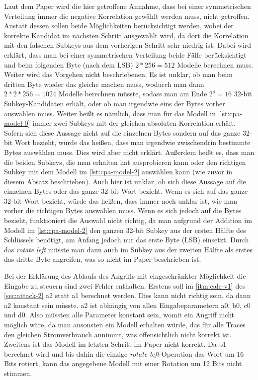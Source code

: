 \documentclass[a4paper,ngerman]{scrreprt}
\begin{document}
Laut dem Paper wird die hier getroffene Annahme, dass bei einer symmetrischen
Verteilung immer die negative Korrelation gewählt werden muss, nicht getroffen.
Anstatt dessen sollen beide Möglichkeiten berücksichtigt werden, wobei der
korrekte Kandidat im nächsten Schritt ausgewählt wird, da dort die Korrelation
mit den falschen Subkeys aus dem vorherigen Schritt sehr niedrig ist. Dabei wird
erklärt, dass man bei einer symmetrischen Verteilung beide Fälle berücksichtigt
und beim folgenden Byte (nach dem LSB) $2*256 = 512$ Modelle berechnen muss.
Weiter wird das Vorgehen nicht beschriebenen. Es ist unklar, ob man beim dritten
Byte wieder das gleiche machen muss, wodurch man dann $2*2*256 = 1024$ Modelle
berechnen müsste, sodass man am Ende $2^4 = 16$ 32-bit Subkey-Kandidaten erhält,
oder ob man irgendwie eins der Bytes vorher auswählen muss. Weiter heißt es
nämlich, dass man für das Modell in \autoref{lst:cpa-model-0} immer zwei Subkeys
mit der gleichen absoluten Korrelation erhält. Sofern sich diese Aussage nicht
auf die einzelnen Bytes sondern auf das ganze 32-bit Wort bezieht, würde das
heißen, dass man irgendwie zwischendrin bestimmte Bytes auswählen muss. Dies
wird aber nicht erklärt. Außerdem heißt es, dass man die beiden Subkeys, die man
erhalten hat ausprobieren kann oder den richtigen Subkey mit dem Modell im
\autoref{lst:cpa-model-2} auswählen kann (wie zuvor in diesem Absatz
beschrieben). Auch hier ist unklar, ob sich diese Aussage auf die einzelnen
Bytes oder das ganze 32-bit Wort bezieht. Wenn es sich auf das ganze 32-bit Wort
bezieht, würde das heißen, dass immer noch unklar ist, wie man vorher die
richtigen Bytes auswählen muss. Wenn es sich jedoch auf die Bytes bezieht,
funktioniert die Auswahl nicht richtig, da man aufgrund der Addition im Modell
im \autoref{lst:cpa-model-2} den ganzen 32-bit Subkey aus der ersten Hälfte des
Schlüssels benötigt, am Anfang jedoch nur das erste Byte (LSB) einsetzt.  Durch
das \emph{rotate left} müsste man dann auch im Subkey aus der zweiten Hälfte als
erstes das dritte Byte angreifen, was so nicht im Paper beschrieben ist.

Bei der Erklärung des Ablaufs des Angriffs mit eingeschränkter Möglichkeit die
Eingabe zu steuern sind zwei Fehler enthalten. Erstens soll im
\autoref{itm:calc-v1} des \autoref{sec:attack-2} a2 statt a1 berechnet werden.
Dies kann nicht richtig sein, da dann a2 konstant sein müsste. a2 ist abhängig
von allen Eingabeparametern a0, b0, c0 und d0. Also müssten alle Parameter
konstant sein, womit ein Angriff nicht möglich wäre, da man ansonsten ein Modell
erhalten würde, das für alle Traces den gleichen Stromverbrauch annimmt, was
offensichtlich nicht korrekt ist. Zweitens ist das Modell im letzten Schritt im
Paper nicht korrekt. Da b1 berechnet wird und bis dahin die einzige \emph{rotate
left}-Operation das Wort um 16 Bits rotiert, kann das angegebene Modell mit
einer Rotation um 12 Bits nicht stimmen.
\end{document}
